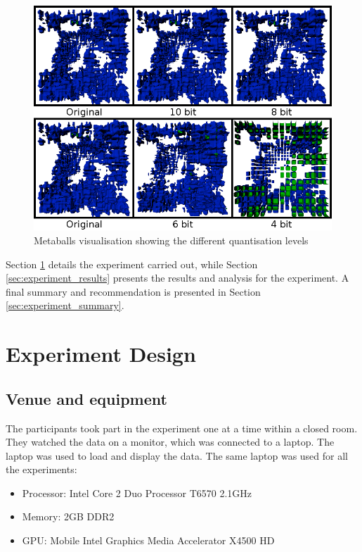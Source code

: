 \begin{figure}[h!]
  \begin{center}
    \includegraphics[width=120mm]{metaballs4680}
  \end{center}
  \caption{Metaballs visualisation showing the different quantisation
  levels}
  \label{fig:experiment_metaballs4680}
\end{figure}

Section \ref{sec:experiment_design} details the experiment carried out, while
Section \ref{sec:experiment_results} presents the results and analysis for the
experiment. A final summary and recommendation is presented in Section
\ref{sec:experiment_summary}.


\section{Experiment Design}
\label{sec:experiment_design}

\subsection{Venue and equipment}
\label{sub:experiment_venue}

The participants took part in the experiment one at a time within a closed
room. They watched the data on a monitor, which was connected to a laptop. The
laptop was used to load and display the data. The same laptop was used for all
the experiments:
\begin{itemize}
  \item Processor: Intel Core 2 Duo Processor T6570 2.1GHz
  \item Memory: 2GB DDR2
  \item GPU: Mobile Intel Graphics Media Accelerator X4500 HD
\end{itemize}

